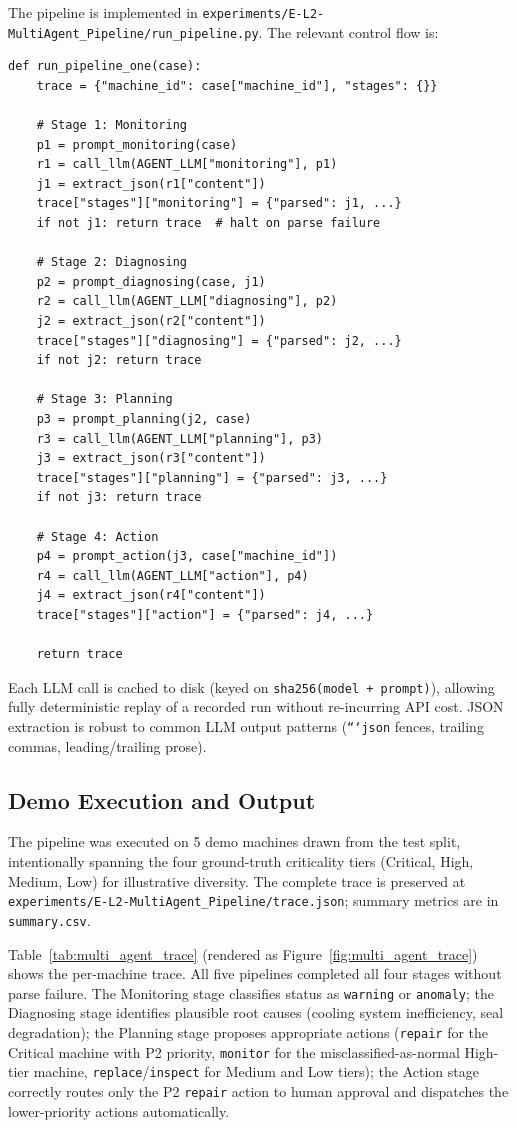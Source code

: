 The pipeline is implemented in \texttt{experiments/E-L2-MultiAgent\_Pipeline/run\_pipeline.py}. The relevant control flow is:

\begin{verbatim}
def run_pipeline_one(case):
    trace = {"machine_id": case["machine_id"], "stages": {}}

    # Stage 1: Monitoring
    p1 = prompt_monitoring(case)
    r1 = call_llm(AGENT_LLM["monitoring"], p1)
    j1 = extract_json(r1["content"])
    trace["stages"]["monitoring"] = {"parsed": j1, ...}
    if not j1: return trace  # halt on parse failure

    # Stage 2: Diagnosing
    p2 = prompt_diagnosing(case, j1)
    r2 = call_llm(AGENT_LLM["diagnosing"], p2)
    j2 = extract_json(r2["content"])
    trace["stages"]["diagnosing"] = {"parsed": j2, ...}
    if not j2: return trace

    # Stage 3: Planning
    p3 = prompt_planning(j2, case)
    r3 = call_llm(AGENT_LLM["planning"], p3)
    j3 = extract_json(r3["content"])
    trace["stages"]["planning"] = {"parsed": j3, ...}
    if not j3: return trace

    # Stage 4: Action
    p4 = prompt_action(j3, case["machine_id"])
    r4 = call_llm(AGENT_LLM["action"], p4)
    j4 = extract_json(r4["content"])
    trace["stages"]["action"] = {"parsed": j4, ...}

    return trace
\end{verbatim}

Each LLM call is cached to disk (keyed on \texttt{sha256(model + prompt)}), allowing fully deterministic replay of a recorded run without re-incurring API cost. JSON extraction is robust to common LLM output patterns (\texttt{```json} fences, trailing commas, leading/trailing prose).

\subsection{Demo Execution and Output}

The pipeline was executed on 5 demo machines drawn from the test split, intentionally spanning the four ground-truth criticality tiers (Critical, High, Medium, Low) for illustrative diversity. The complete trace is preserved at \texttt{experiments/E-L2-MultiAgent\_Pipeline/trace.json}; summary metrics are in \texttt{summary.csv}.

Table~\ref{tab:multi_agent_trace} (rendered as Figure~\ref{fig:multi_agent_trace}) shows the per-machine trace. All five pipelines completed all four stages without parse failure. The Monitoring stage classifies status as \texttt{warning} or \texttt{anomaly}; the Diagnosing stage identifies plausible root causes (cooling system inefficiency, seal degradation); the Planning stage proposes appropriate actions (\texttt{repair} for the Critical machine with P2 priority, \texttt{monitor} for the misclassified-as-normal High-tier machine, \texttt{replace}/\texttt{inspect} for Medium and Low tiers); the Action stage correctly routes only the P2 \texttt{repair} action to human approval and dispatches the lower-priority actions automatically.

